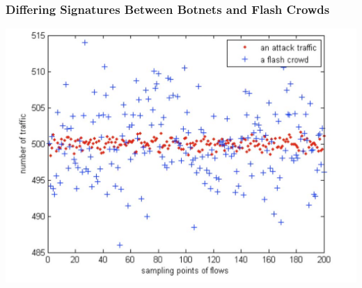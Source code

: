 \documentclass[10pt,mathserif]{beamer}
\begin{document}
\begin{frame}
  \frametitle{Differing Signatures Between Botnets and Flash Crowds}
  \includegraphics[width=\textwidth,natwidth=1388,natheight=1004]{figures/traffic_comp.png}
\end{frame}
\end{document}
